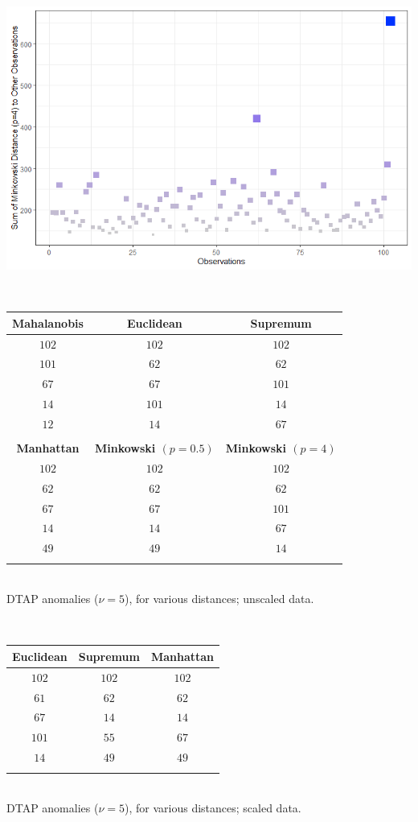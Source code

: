 \documentclass[20pt,landscape,footrule,headrule]{foils}
\begin{document}
\newpage
\begin{center}
\includegraphics[width=\textwidth]{Images/AD_L4_sum}
\end{center}
\newpage\ 
\begin{center}
\begin{tabular}{ccc}
\textbf{Mahalanobis} & 
\textbf{Euclidean}   & 
\textbf{Supremum}    \\ \hline
$102$ & $102$ & $102$ \\
$101$ & $62$  & $62$  \\
$67$  & $67$  & $101$ \\
$14$  & $101$ & $14$  \\
$12$  & $14$  & $67$  \\
& & \\
\textbf{Manhattan}   &
\textbf{Minkowski $(p=0.5)$} & \textbf{Minkowski $(p=4)$} \\ \hline
$102$ & $102$ & $102$ \\
$62$ & $62$  & $62$  \\
$67$  & $67$  & $101$ \\
$14$  & $14$ & $67$  \\
$49$  & $49$  & $14$  \\
& & \\
\end{tabular} \\ 
DTAP anomalies ($\nu=5$), for various distances; unscaled data.
\end{center}
\newpage\ \\  
\begin{center}
\begin{tabular}{ccc}
\textbf{Euclidean} & 
\textbf{Supremum}   & 
\textbf{Manhattan}    \\ \hline
$102$ & $102$ & $102$ \\
$61$ & $62$  & $62$  \\
$67$  & $14$  & $14$ \\
$101$  & $55$  & $67$  \\
$14$  & $49$  & $49$  \\
& & \\
\end{tabular} \\ 
DTAP anomalies ($\nu=5$), for various distances; scaled data.
\end{center}
\end{document}

